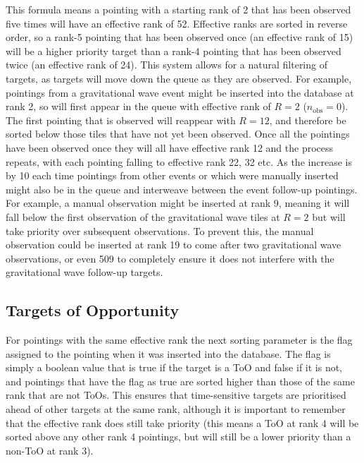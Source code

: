 \begin{colsection}
\begin{colsection}
This formula means a pointing with a starting rank of 2 that has been observed five times will have an effective rank of 52. Effective ranks are sorted in reverse order, so a rank-5 pointing that has been observed once (an effective rank of 15) will be a higher priority target than a rank-4 pointing that has been observed twice (an effective rank of 24). This system allows for a natural filtering of targets, as targets will move down the queue as they are observed. For example, pointings from a gravitational wave event might be inserted into the database at rank 2, so will first appear in the queue with effective rank of $R=2$ ($n_\text{obs}=0$). The first pointing that is observed will reappear with $R=12$, and therefore be sorted below those tiles that have not yet been observed. Once all the pointings have been observed once they will all have effective rank 12 and the process repeats, with each pointing falling to effective rank 22, 32 etc. As the increase is by 10 each time pointings from other events or which were manually inserted might also be in the queue and interweave between the event follow-up pointings. For example, a manual observation might be inserted at rank 9, meaning it will fall below the first observation of the gravitational wave tiles at $R=2$ but will take priority over subsequent observations. To prevent this, the manual observation could be inserted at rank 19 to come after two gravitational wave observations, or even 509 to completely ensure it does not interfere with the gravitational wave follow-up targets.

\end{colsection}

\subsection{Targets of Opportunity}
\label{sec:toos}
\begin{colsection}

For pointings with the same effective rank the next sorting parameter is the  flag assigned to the pointing when it was inserted into the database. The flag is simply a boolean value that is true if the target is a ToO and false if it is not, and pointings that have the flag as true are sorted higher than those of the same rank that are not ToOs. This ensures that time-sensitive targets are prioritised ahead of other targets at the same rank, although it is important to remember that the effective rank does still take priority (this means a ToO at rank 4 will be sorted above any other rank 4 pointings, but will still be a lower priority than a non-ToO at rank 3).


\end{colsection}
\end{colsection}
